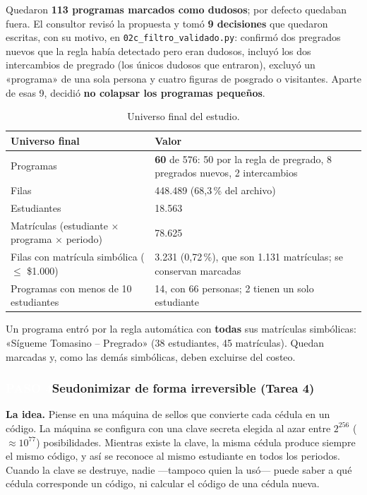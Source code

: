 \documentclass[11pt,a4paper,twoside,twocolumn]{article}
\newcommand{\cod}[1]{\nolinkurl{#1}}
\newcommand{\paso}[2]{\subsubsection*{\colorbox{ustaAzul}{\textcolor{white}{\scriptsize\sffamily\bfseries PASO #1}}\enspace #2}}
\newcommand{\cab}[1]{\textcolor{ustaAzul}{\textbf{#1}}}
\begin{document}
Quedaron \textbf{113 programas marcados como dudosos}; por defecto quedaban fuera. El consultor
revisó la propuesta y tomó \textbf{9 decisiones} que quedaron escritas, con su motivo, en
\cod{02c_filtro_validado.py}: confirmó dos pregrados nuevos que la regla había detectado pero
eran dudosos, incluyó los dos intercambios de pregrado (los únicos dudosos que entraron), excluyó
un «programa» de una sola persona y cuatro figuras de posgrado o visitantes. Aparte de esas 9,
decidió \textbf{no colapsar los programas pequeños}.

\begin{table}[!ht]
\centering
\caption{Universo final del estudio.}
\label{tab:universo}
\footnotesize
\begin{tabularx}{\columnwidth}{@{}L P{3.7cm}@{}}
\toprule
\cab{Universo final} & \cab{Valor} \\
\midrule
Programas & \textbf{60} de 576: 50 por la regla de pregrado, 8 pregrados nuevos, 2 intercambios \\
Filas & 448.489 (68,3\,\% del archivo) \\
Estudiantes & 18.563 \\
Matrículas (estudiante $\times$ programa $\times$ periodo) & 78.625 \\
Filas con matrícula simbólica ($\leq$ \$1.000) & 3.231 (0,72\,\%), que son 1.131 matrículas; se conservan marcadas \\
Programas con menos de 10 estudiantes & 14, con 66 personas; 2 tienen un solo estudiante \\
\bottomrule
\end{tabularx}
\end{table}

Un programa entró por la regla automática con \textbf{todas} sus matrículas simbólicas: «Sígueme
Tomasino -- Pregrado» (38 estudiantes, 45 matrículas). Quedan marcadas y, como las demás
simbólicas, deben excluirse del costeo.

\paso{4}{Seudonimizar de forma irreversible (Tarea 4)}

\begin{dorada}
\textbf{La idea.} Piense en una máquina de sellos que convierte cada cédula en un código. La
máquina se configura con una clave secreta elegida al azar entre $2^{256}$ ($\approx 10^{77}$)
posibilidades. Mientras existe la clave, la misma cédula produce siempre el mismo código, y así
se reconoce al mismo estudiante en todos los periodos. Cuando la clave se destruye, nadie
---tampoco quien la usó--- puede saber a qué cédula corresponde un código, ni calcular el código
de una cédula nueva.
\end{dorada}
\end{document}
